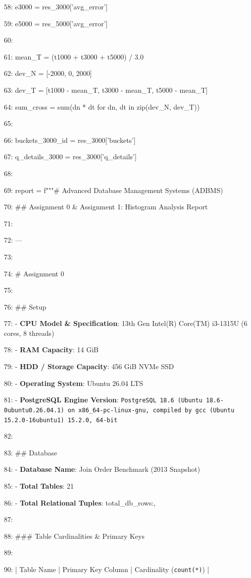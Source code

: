 \documentclass[11pt,a4paper]{article}
\begin{document}
{58:     e3000 = res\_3000['avg\_error']

59:     e5000 = res\_5000['avg\_error']

60:

61:     mean\_T = (t1000 + t3000 + t5000) / 3.0

62:     dev\_N = [-2000, 0, 2000]

63:     dev\_T = [t1000 - mean\_T, t3000 - mean\_T, t5000 - mean\_T]

64:     sum\_cross = sum(dn * dt for dn, dt in zip(dev\_N, dev\_T))

65:

66:     buckets\_3000\_id = res\_3000['buckets']

67:     q\_details\_3000 = res\_3000['q\_details']

68:

69:     report = f"""\# Advanced Database Management Systems (ADBMS)

70: \#\# Assignment 0 \& Assignment 1: Histogram Analysis Report

71:

72: ---

73:

74: \# Assignment 0

75:

76: \#\# Setup

77: - \textbf{CPU Model \& Specification}: 13th Gen Intel(R) Core(TM) i3-1315U (6 cores, 8 threads)

78: - \textbf{RAM Capacity}: 14 GiB

79: - \textbf{HDD / Storage Capacity}: 456 GiB NVMe SSD

80: - \textbf{Operating System}: Ubuntu 26.04 LTS

81: - \textbf{PostgreSQL Engine Version}: \texttt{PostgreSQL 18.6 (Ubuntu 18.6-0ubuntu0.26.04.1) on x86\_64-pc-linux-gnu, compiled by gcc (Ubuntu 15.2.0-16ubuntu1) 15.2.0, 64-bit}

82:

83: \#\# Database

84: - \textbf{Database Name}: Join Order Benchmark (2013 Snapshot)

85: - \textbf{Total Tables}: 21

86: - \textbf{Total Relational Tuples}: {total\_db\_rows:,}

87:

88: \#\#\# Table Cardinalities \& Primary Keys

89:

90: | Table Name | Primary Key Column | Cardinality (\texttt{count(*)}) |

}
\end{document}
